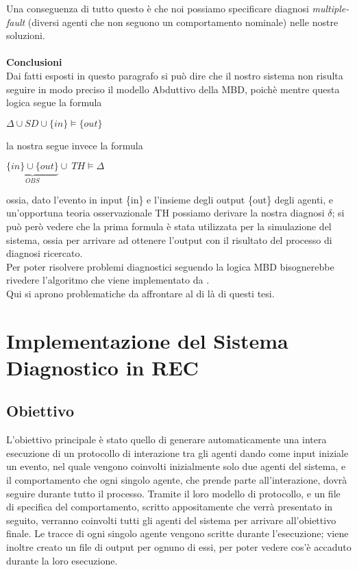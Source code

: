\documentclass[a4paper,12pt]{report}
\begin{document}
\newpage
Una conseguenza di tutto questo è che noi possiamo specificare diagnosi \textit{multiple-fault} (diversi agenti che non seguono un comportamento nominale) nelle nostre soluzioni.\\
\\\textbf{Conclusioni}
\\Dai fatti esposti in questo paragrafo si può dire che il nostro sistema non risulta seguire in modo preciso il modello Abduttivo della MBD, poichè mentre questa logica segue la formula
\begin{center}
    $\Delta\cup SD\cup \{in\}\models \{out\}$
\end{center}
la nostra segue invece la formula
\begin{center}
    $\underbrace{\{in\}\cup\{out\}}_{OBS}\cup\ TH\models \Delta$
\end{center}
ossia, dato l'evento in input \{in\} e l'insieme degli output \{out\} degli agenti, e un'opportuna teoria osservazionale TH possiamo derivare la nostra diagnosi $\delta$; si può però vedere che la prima formula è stata utilizzata per la simulazione del sistema, ossia per arrivare ad ottenere l'output con il risultato del processo di diagnosi ricercato.
\\Per poter risolvere problemi diagnostici seguendo la logica MBD bisognerebbe rivedere l'algoritmo che viene implementato da \cite{rif5}.
\\Qui si aprono problematiche da affrontare al di là di questi tesi.
\newpage
\chapter{Implementazione del Sistema Diagnostico in REC}
\section{Obiettivo}
L'obiettivo principale è stato quello di generare automaticamente una intera esecuzione di un protocollo di interazione tra gli agenti dando come input iniziale un evento, nel quale vengono coinvolti inizialmente solo due agenti del sistema, e il comportamento che ogni singolo agente, che prende parte all'interazione, dovrà seguire durante tutto il processo. Tramite il loro modello di protocollo, e un file di specifica del comportamento, scritto appositamente che verrà presentato in seguito, verranno coinvolti tutti gli agenti del sistema per arrivare all'obiettivo finale. Le tracce di ogni singolo agente vengono scritte durante l'esecuzione; viene inoltre creato un file di output per ognuno di essi, per poter vedere cos'è accaduto durante la loro esecuzione.
\end{document}
